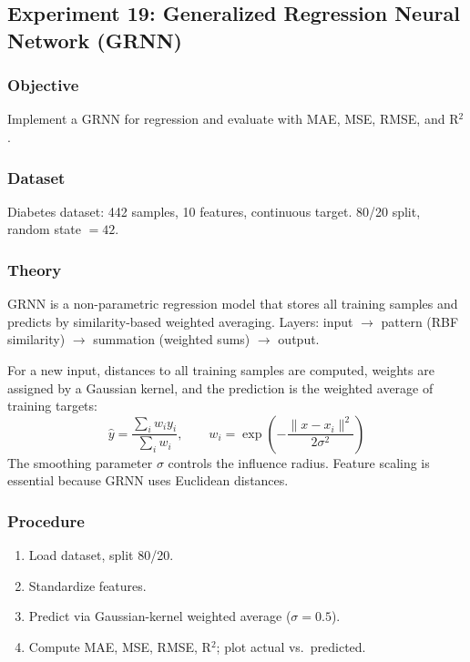 \documentclass[a4paper,10pt]{article}
\begin{document}
\subsection{Experiment 19: Generalized Regression Neural Network (GRNN)}

\subsubsection{Objective}
Implement a GRNN for regression and evaluate with MAE, MSE, RMSE, and R\(^2\).

\subsubsection{Dataset}
Diabetes dataset: 442 samples, 10 features, continuous target. 80/20 split, random state \(=42\).

\subsubsection{Theory}
GRNN is a non-parametric regression model that stores all training samples and predicts by similarity-based weighted averaging. Layers: input \(\rightarrow\) pattern (RBF similarity) \(\rightarrow\) summation (weighted sums) \(\rightarrow\) output.

For a new input, distances to all training samples are computed, weights are assigned by a Gaussian kernel, and the prediction is the weighted average of training targets:
\[
\hat{y} = \frac{\sum_i w_i y_i}{\sum_i w_i}, \qquad w_i = \exp\!\left(-\frac{\|x - x_i\|^2}{2\sigma^2}\right)
\]
The smoothing parameter \(\sigma\) controls the influence radius. Feature scaling is essential because GRNN uses Euclidean distances.

\subsubsection{Procedure}
\begin{enumerate}[nosep]
    \item Load dataset, split 80/20.
    \item Standardize features.
    \item Predict via Gaussian-kernel weighted average (\(\sigma=0.5\)).
    \item Compute MAE, MSE, RMSE, R\(^2\); plot actual vs.\ predicted.
\end{enumerate}
\end{document}

